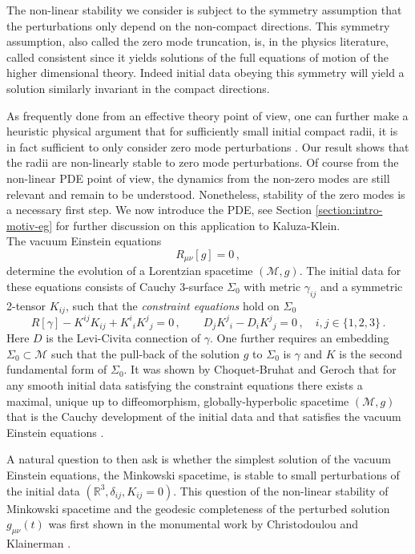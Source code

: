 \documentclass[11pt, a4paper]{amsart}
\numberwithin{equation}{section}
\numberwithin{theorem}{section}
\newcommand{\R}{\mathbb{R}}
\newcommand{\mn}{{\mu \nu}}
\begin{document}
The non-linear stability we consider is subject to the symmetry assumption that the perturbations only depend on the non-compact directions. This symmetry assumption, also called the zero mode truncation, is, in the physics literature, called consistent since it yields solutions of the full equations of motion of the higher dimensional theory. Indeed initial data obeying this symmetry will yield a solution similarly invariant in the compact directions.  

As frequently done from an effective theory point of view, one can further make a heuristic physical argument that for sufficiently small initial compact radii, it is in fact sufficient to only consider zero mode perturbations \cite{Pope}. Our result shows that the radii are non-linearly stable to zero mode perturbations. Of course from the non-linear PDE point of view, the dynamics from the non-zero modes are still relevant and remain to be understood. Nonetheless, stability of the zero modes is a necessary first step. We now introduce the PDE, see Section \ref{section:intro-motiv-eg} for further discussion on this application to Kaluza-Klein. \\


The vacuum Einstein equations
$$ R_\mn [g] = 0 \,,$$
determine the evolution of a Lorentzian spacetime $(\mathcal{M}, g)$. The initial data for these equations consists of Cauchy 3-surface $\Sigma_0$ with metric  $\gamma_{ij}$ and a symmetric 2-tensor $K_{ij}$, such that the \textit{constraint equations} hold on $\Sigma_0$
\begin{equation} R[\gamma] - K^{ij} K_{ij} + K^i{}_i K^j{}_j = 0 \,, \qquad D_j K^j {}_i - D_i K^j{}_j = 0 \,, \quad i, j \in \{1,2,3 \} \,. \label{eq:intro-vacuum-constrainteq} \end{equation}
Here $D$ is the Levi-Civita connection of $\gamma$. 
One further requires an embedding $\Sigma_0 \subset \mathcal{M}$ such that the pull-back of the solution $g$ to $\Sigma_0$ is $\gamma$ and $K$ is the second fundamental form of $\Sigma_0$. 
It was shown by Choquet-Bruhat and Geroch that for any smooth initial data satisfying the constraint equations there exists a maximal, unique up to diffeomorphism, globally-hyperbolic spacetime $(\mathcal{M},g)$ that is the Cauchy development of the initial data and that satisfies the vacuum Einstein equations \cite{choquet-bruhat1969}.

A natural question to then ask is whether the simplest solution of the vacuum Einstein equations, the Minkowski spacetime, is stable to small perturbations of the initial data $(\R^3, \delta_{ij}, K_{ij}=0)$. This question of the non-linear stability of Minkowski spacetime and the geodesic completeness of the perturbed solution $g_\mn(t)$ was first shown in the monumental work by Christodoulou and Klainerman \cite{CK:93}.
\end{document}
